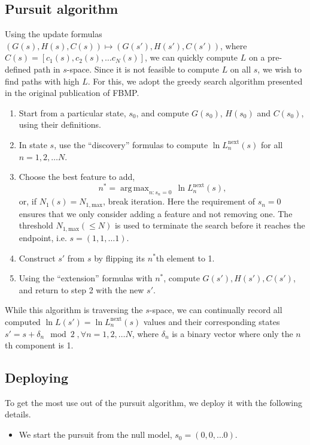 \documentclass[letter,10pt,oneside]{article}
\DeclareMathOperator*{\amax}{arg\,max}
\newcommand{\be}{\begin{equation*}}
\newcommand{\ee}{\end{equation*}}
\newcommand{\no}{\noindent}
\newcommand{\+}{^\dagger}
\newcommand{\s}{^\ast}
\begin{document}
\subsection{Pursuit algorithm}
Using the update formulas $(G(s), H(s), C(s)) \mapsto (G(s'), H(s'), C(s'))$, where $C(s) = [c_1(s), c_2(s), \ldots c_N(s)]$, we can quickly compute $L$ on a pre-defined path in $s$-space. Since it is not feasible to compute $L$ on all $s$, we wish to find paths with high $L$. For this, we adopt the greedy search algorithm presented in the original publication of FBMP.
\begin{enumerate}
  \item Start from a particular state, $s_0$, and compute $G(s_0)$, $H(s_0)$ and $C(s_0)$, using their definitions.
  \item In state $s$, use the ``discovery'' formulas to compute $\ln L^\text{next}_n(s)$ for all $n=1,2,\ldots N$.
  \item Choose the best feature to add,
    \be
      n\s = \amax_{n: s_n = 0} \,\ln L^\text{next}_n(s),
    \ee
    or, if $N_1(s) = N_{1,\text{max}}$, break iteration. 
    Here the requirement of $s_n = 0$ ensures that we only consider adding a feature and not removing one. The threshold $N_{1,\text{max}} (\leq N)$ is used to terminate the search before it reaches the endpoint, i.e. $s=(1,1,\ldots 1)$.
  \item Construct $s'$ from $s$ by flipping its $n\s$th element to 1. 
  \item Using the ``extension'' formulas with $n\s$, compute $G(s'), H(s'), C(s')$, and return to step 2 with the new $s'$.
\end{enumerate}

While this algorithm is traversing the $s$-space, we can continually record all computed $\ln L(s') = \ln L^\text{next}_n(s)$ values and their corresponding states $s' = s + \delta_n \mod 2\;, \forall n = 1,2,\ldots N$, where $\delta_n$ is a binary vector where only the $n$th component is 1.


\subsection{Deploying}

\no To  get the most use out of the pursuit algorithm, we deploy it with the following details.

\begin{itemize}
  \item We start the pursuit from the null model, $s_0 = (0,0,\ldots 0)$.
\end{itemize}
\end{document}
